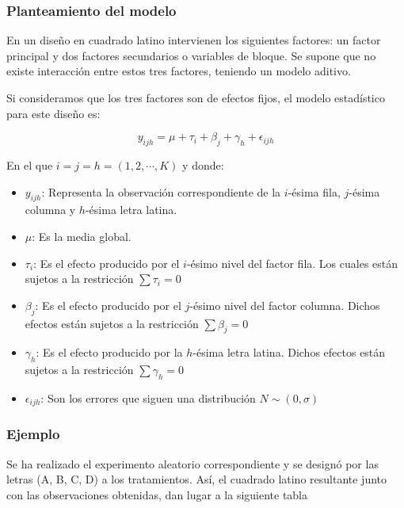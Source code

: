 \subsubsection{Planteamiento del modelo}

En un diseño en cuadrado latino intervienen los siguientes factores: un factor principal y dos factores secundarios o variables de bloque. Se supone que no existe interacción entre estos tres factores, teniendo un modelo aditivo.

Si consideramos que los tres factores son de efectos fijos, el modelo estadístico para este diseño es:

$$
y_{ijh} = \mu + {\tau}_{i} + {\beta}_{j} + {\gamma}_{h} + {\epsilon}_{ijh}
$$

En el que $i=j=h= (1, 2, \cdots , K )$ y donde:

\begin{itemize}
  \item ${y}_{ijh}$: Representa la observación correspondiente de la $i$-ésima fila, $j$-ésima columna y $h$-ésima letra latina.
  \item $\mu$: Es la media global.
  \item $\tau_i$: Es el efecto producido por el $i$-ésimo nivel del factor fila. Los cuales están sujetos a la restricción $\sum {\tau}_{i} = 0$
  \item ${\beta}_{j}$: Es el efecto producido por el $j$-ésimo nivel del factor columna. Dichos efectos están sujetos a la restricción $\sum {\beta}_{j} = 0$
  \item ${\gamma}_{h}$: Es el efecto producido por la $h$-ésima letra latina. Dichos efectos están sujetos a la restricción $\sum {\gamma}_{h} = 0$
  \item ${\epsilon}_{ijh}$: Son los errores que siguen una distribución $N \sim (0,\sigma)$
\end{itemize}

\subsubsection{Ejemplo}

Se ha realizado el experimento aleatorio correspondiente y se designó por las letras (A, B, C, D) a los tratamientos. Así, el cuadrado latino resultante junto con las observaciones obtenidas, dan lugar a la siguiente tabla

